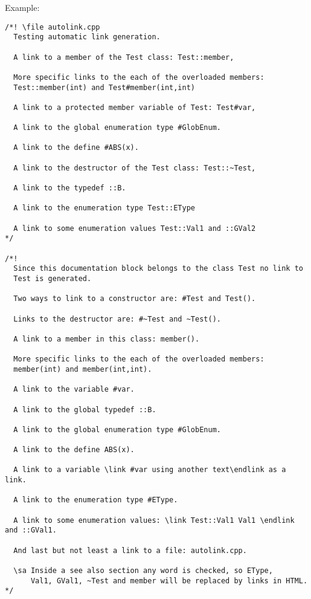 \begin{Desc}
\item[Example:]

\begin{VerbInclude}\begin{verbatim}/*! \file autolink.cpp
  Testing automatic link generation.
  
  A link to a member of the Test class: Test::member, 
  
  More specific links to the each of the overloaded members:
  Test::member(int) and Test#member(int,int)

  A link to a protected member variable of Test: Test#var, 

  A link to the global enumeration type #GlobEnum.
 
  A link to the define #ABS(x).
  
  A link to the destructor of the Test class: Test::~Test, 
  
  A link to the typedef ::B.
 
  A link to the enumeration type Test::EType
  
  A link to some enumeration values Test::Val1 and ::GVal2
*/

/*!
  Since this documentation block belongs to the class Test no link to 
  Test is generated.

  Two ways to link to a constructor are: #Test and Test().

  Links to the destructor are: #~Test and ~Test().
  
  A link to a member in this class: member().

  More specific links to the each of the overloaded members: 
  member(int) and member(int,int). 
  
  A link to the variable #var.

  A link to the global typedef ::B.

  A link to the global enumeration type #GlobEnum.
  
  A link to the define ABS(x).
  
  A link to a variable \link #var using another text\endlink as a link.
  
  A link to the enumeration type #EType.

  A link to some enumeration values: \link Test::Val1 Val1 \endlink and ::GVal1.

  And last but not least a link to a file: autolink.cpp.
  
  \sa Inside a see also section any word is checked, so EType, 
      Val1, GVal1, ~Test and member will be replaced by links in HTML.
*/


\end{verbatim}
\end{VerbInclude}
\end{Desc}
